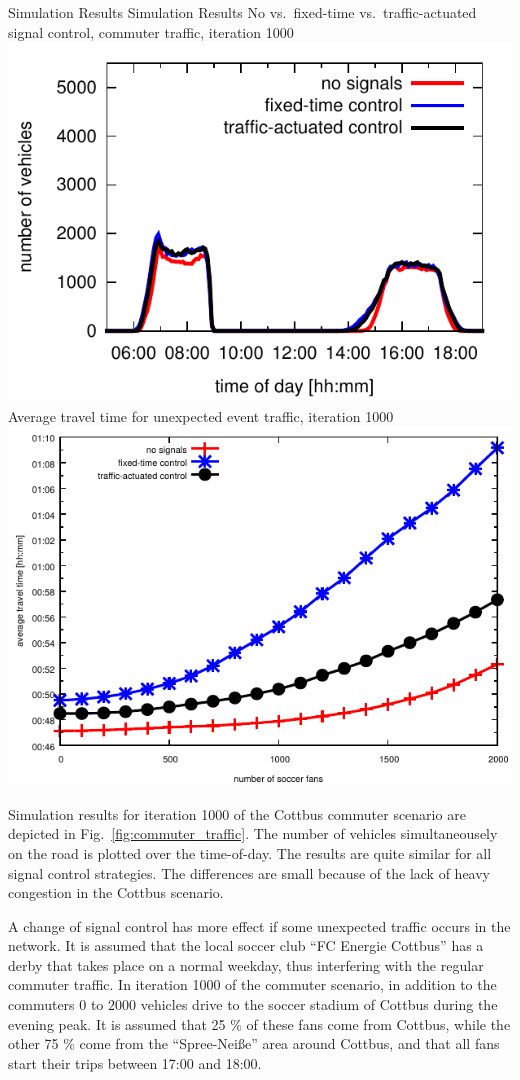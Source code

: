 \createfigure%
{Simulation Results}%
{Simulation Results}%
{\label{fig:results_histogram}}
{%
  \createsubfigure%
  {No vs.~fixed-time vs.~traffic-actuated signal control, commuter traffic, iteration 1000}%
	{\includegraphics[width=0.48\linewidth]{extending/figures/signalslanes/leg_histogram_1292_1293_1291_it_1000.pdf}}
  {\label{fig:commuter_traffic}}%
  \createsubfigure%
	{Average travel time for unexpected event traffic, iteration 1000}
	{\includegraphics[width=0.48\linewidth]{extending/figures/signalslanes/average_travel_time_1220_1222_book.pdf}}
	{\label{fig:unexpected_event}}
}%
{\citet{Grether2014PhD}}

Simulation results for iteration 1000 of the Cottbus commuter scenario are depicted in
Fig.~\ref{fig:commuter_traffic}. 
The number of vehicles simultaneousely on the road is plotted over the time-of-day. 
The results are quite similar for all signal control strategies. 
The differences are small because of the lack of heavy congestion in the Cottbus scenario. 

A change of signal control has more effect if some unexpected traffic occurs in the network. 
It is assumed that the local soccer club ``FC Energie Cottbus'' has a derby that takes place on a normal weekday, thus interfering with the regular commuter traffic. 
In iteration 1000 of the commuter scenario, in addition to the commuters $0$ to $2000$ vehicles drive to the soccer stadium of Cottbus during the evening peak. 
It is assumed that 25 \% of these fans come from Cottbus,
while the other 75 \% come from the ``Spree-Nei{\ss}e'' area around Cottbus, and that all fans start their trips between 17:00 and 18:00. 

